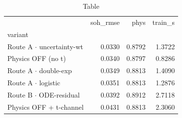 \begin{table}
\caption{Table}
\label{tab:table}
\begin{tabular}{lrrr}
\toprule
 & soh\_rmse & phys & train\_s \\
variant &  &  &  \\
\midrule
Route A $\cdot$ uncertainty-wt & 0.0330 & 0.8792 & 1.3722 \\
Physics OFF (no t) & 0.0340 & 0.8797 & 0.8286 \\
Route A $\cdot$ double-exp & 0.0349 & 0.8813 & 1.4090 \\
Route A $\cdot$ logistic & 0.0351 & 0.8813 & 1.2876 \\
Route B $\cdot$ ODE-residual & 0.0392 & 0.8912 & 2.7118 \\
Physics OFF + t-channel & 0.0431 & 0.8813 & 2.3060 \\
\bottomrule
\end{tabular}
\end{table}
